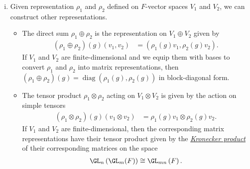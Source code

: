 \documentclass[10pt]{mypackage}
\begin{document}
\begin{example}
\begin{enumerate}[(i)]
      We have a natural bijection between linear representations of a group $G$ of the form $\left( \rho,V \right)$ and $F[G]$-modules extending the $F$-vector space structure on $V$ by defining
      \begin{align*}
        \left( \lambda 1 \right).v &= \lambda v\\
        \left( \sum_{\alpha}f_{\alpha}g_{\alpha} \right)v &= \sum_{\alpha}f_{\alpha}\rho\left( g_{\alpha} \right)v
      \end{align*}
      Moreover, the representations $\left( \rho_1,V_1 \right)$ and $\left( \rho_2,V_2 \right)$ are isomorphic if and only if their corresponding $F[G]$-modules are isomorphic.
    \item Given representation $\rho_1$  and $\rho_2$ defined on $F$-vector spaces $V_1$ and $V_2$, we can construct other representations.
      \begin{itemize}
        \item The direct sum $\rho_1\oplus \rho_2$ is the representation on $V_1\oplus V_2$ given by
          \begin{align*}
            \left( \rho_1\oplus\rho_2 \right)\left( g \right)\left( v_1,v_2 \right) &= \left( \rho_1(g)v_1,\rho_2(g)v_2 \right).
          \end{align*}
          If $V_1$ and $V_2$ are finite-dimensional and we equip them with bases to convert $\rho_1$ and $\rho_2$ into matrix representations, then $\left( \rho_1\oplus\rho_2 \right)(g) = \operatorname{diag}\left( \rho_1(g),\rho_2(g) \right)$ in block-diagonal form.
        \item The tensor product $\rho_1\otimes \rho_2$ acting on $V_1\otimes V_2$ is given by the action on simple tensors
          \begin{align*}
            \left( \rho_1\otimes \rho_2 \right)(g)\left( v_1\otimes v_2 \right) &= \rho_1(g)v_1\otimes \rho_2(g)v_2.
          \end{align*}
          If $V_1$ and $V_2$ are finite-dimensional, then the corresponding matrix representations have their tensor product given by the \textit{\href{https://en.wikipedia.org/wiki/Kronecker_product}{Kronecker product}} of their corresponding matrices on the space 
          \begin{align*}
            \GL_n\left( \GL_m(F) \right) \cong \GL_{mn}\left( F \right).
          \end{align*}
      \end{itemize}
  \end{enumerate}
\end{example}
\end{document}
